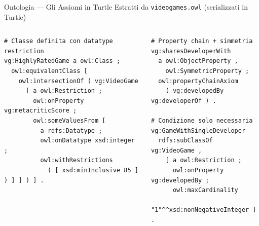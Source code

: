 \documentclass[aspectratio=169,11pt]{beamer}
\begin{document}
\begin{frame}[fragile]{Ontologia --- Gli Assiomi in Turtle}
  {\small Estratti da \texttt{videogames.owl} (serializzati in Turtle)}
  \vspace{2pt}

  \begin{columns}[T]
\begin{lstlisting}[style=turtle]
# Classe definita con datatype restriction
vg:HighlyRatedGame a owl:Class ;
  owl:equivalentClass [
    owl:intersectionOf ( vg:VideoGame
      [ a owl:Restriction ;
        owl:onProperty vg:metacriticScore ;
        owl:someValuesFrom [
          a rdfs:Datatype ;
          owl:onDatatype xsd:integer ;
          owl:withRestrictions
            ( [ xsd:minInclusive 85 ] ) ] ] ) ] .
\end{lstlisting}

\begin{lstlisting}[style=turtle]
# Property chain + simmetria
vg:sharesDeveloperWith
  a owl:ObjectProperty ,
    owl:SymmetricProperty ;
  owl:propertyChainAxiom
    ( vg:developedBy vg:developerOf ) .

# Condizione solo necessaria
vg:GameWithSingleDeveloper
  rdfs:subClassOf vg:VideoGame ,
    [ a owl:Restriction ;
      owl:onProperty vg:developedBy ;
      owl:maxCardinality
        "1"^^xsd:nonNegativeInteger ] .
\end{lstlisting}
  \end{columns}
\end{frame}
\end{document}
